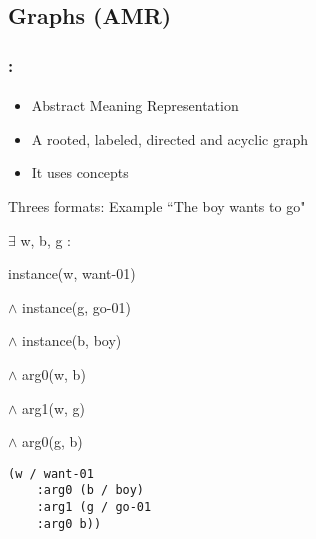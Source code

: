 \documentclass[xcolor=table]{beamer}
\begin{document}
\subsection{Graphs (AMR)}

\begin{frame}[fragile]
	\frametitle{\insertshortsubtitle: \insertsection}
	\framesubtitle{\insertsubsection}
	
	\begin{itemize}
		\item Abstract Meaning Representation \cite{2013-banarescu-al}
		\item A rooted, labeled, directed and acyclic graph
		\item It uses  concepts
	\end{itemize}

	\begin{exampleblock}{Threes formats: Example ``The boy wants to go"}
		\begin{minipage}{.3\textwidth}
			
			\footnotesize
			$ \exists $ w, b, g : 
			
			instance(w, want-01) 
			
			$ \wedge $ instance(g, go-01) 
			
			$ \wedge $ instance(b, boy) 
			
			$ \wedge $ arg0(w, b) 
			
			$ \wedge $ arg1(w, g) 
			
			$ \wedge $ arg0(g, b)
		\end{minipage}
		\begin{minipage}{.35\textwidth}
			
			\begin{verbatim}
(w / want-01
    :arg0 (b / boy)
    :arg1 (g / go-01
    :arg0 b))
			\end{verbatim}
			
		\end{minipage}
		\begin{minipage}{.3\textwidth}
			
		\end{minipage}
	\end{exampleblock}
	
\end{frame}
\end{document}
